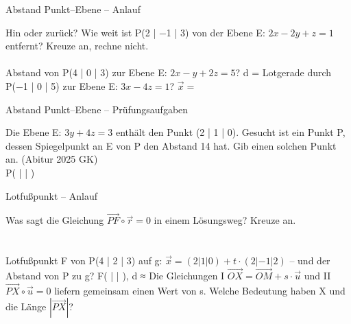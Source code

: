 \begin{aufgabe}{Abstand Punkt–Ebene – Anlauf}
\begin{teile}
\teil Hin oder zurück? Wie weit ist P(2 | −1 | 3) von der Ebene E: $2x - 2y + z = 1$ entfernt? Kreuze an, rechne nicht. \\  \\ 
\teil Abstand von P(4 | 0 | 3) zur Ebene E: $2x - y + 2z = 5$? d = \leerfeld
\teil Lotgerade durch P(−1 | 0 | 5) zur Ebene E: $3x - 4z = 1$? $\vec x = $ \leerfeld
\end{teile}
\end{aufgabe}

\begin{aufgabe}{Abstand Punkt–Ebene – Prüfungsaufgaben}
\begin{teile}
\teil Die Ebene E: $3y + 4z = 3$ enthält den Punkt (2 | 1 | 0). Gesucht ist ein Punkt P, dessen Spiegelpunkt an E von P den Abstand 14 hat. Gib einen solchen Punkt an. \hfill (Abitur 2025 GK) \\ P( \leerfeld | \leerfeld | \leerfeld )
\end{teile}
\end{aufgabe}

\begin{aufgabe}{Lotfußpunkt – Anlauf}
\begin{teile}
\teil Was sagt die Gleichung $\overrightarrow{PF} \circ \vec r = 0$ in einem Lösungsweg? Kreuze an. \\  \\  \\ 
\teil Lotfußpunkt F von P(4 | 2 | 3) auf g: $\vec x = (2 | 1 | 0) + t \cdot (2 | -1 | 2)$ – und der Abstand von P zu g? F( \leerfeld | \leerfeld | \leerfeld ), d ≈ \leerfeld
\teil Die Gleichungen I $\overrightarrow{OX} = \overrightarrow{OM} + s \cdot \vec u$ und II $\overrightarrow{PX} \circ \vec u = 0$ liefern gemeinsam einen Wert von s. Welche Bedeutung haben X und die Länge $|\overrightarrow{PX}|$?
\end{teile}
\end{aufgabe}

